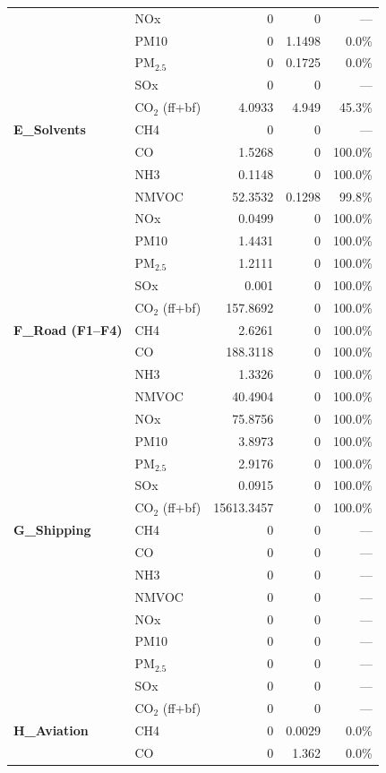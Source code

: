 \begin{longtable}{@{}llrrr@{}}
 & NOx & 0 & 0 & --- \\
 & PM10 & 0 & 1.1498 & 0.0\% \\
 & PM$_{2.5}$ & 0 & 0.1725 & 0.0\% \\
 & SOx & 0 & 0 & --- \\
 & CO$_2$ (ff+bf) & 4.0933 & 4.949 & 45.3\% \\
 \midrule
\addlinespace[2pt]
\textbf{E\_Solvents} & CH4 & 0 & 0 & --- \\
 & CO & 1.5268 & 0 & 100.0\% \\
 & NH3 & 0.1148 & 0 & 100.0\% \\
 & NMVOC & 52.3532 & 0.1298 & 99.8\% \\
 & NOx & 0.0499 & 0 & 100.0\% \\
 & PM10 & 1.4431 & 0 & 100.0\% \\
 & PM$_{2.5}$ & 1.2111 & 0 & 100.0\% \\
 & SOx & 0.001 & 0 & 100.0\% \\
 & CO$_2$ (ff+bf) & 157.8692 & 0 & 100.0\% \\
 \midrule
\addlinespace[2pt]
\textbf{F\_Road (F1--F4)} & CH4 & 2.6261 & 0 & 100.0\% \\
 & CO & 188.3118 & 0 & 100.0\% \\
 & NH3 & 1.3326 & 0 & 100.0\% \\
 & NMVOC & 40.4904 & 0 & 100.0\% \\
 & NOx & 75.8756 & 0 & 100.0\% \\
 & PM10 & 3.8973 & 0 & 100.0\% \\
 & PM$_{2.5}$ & 2.9176 & 0 & 100.0\% \\
 & SOx & 0.0915 & 0 & 100.0\% \\
 & CO$_2$ (ff+bf) & 15613.3457 & 0 & 100.0\% \\
 \midrule
\addlinespace[2pt]
\textbf{G\_Shipping} & CH4 & 0 & 0 & --- \\
 & CO & 0 & 0 & --- \\
 & NH3 & 0 & 0 & --- \\
 & NMVOC & 0 & 0 & --- \\
 & NOx & 0 & 0 & --- \\
 & PM10 & 0 & 0 & --- \\
 & PM$_{2.5}$ & 0 & 0 & --- \\
 & SOx & 0 & 0 & --- \\
 & CO$_2$ (ff+bf) & 0 & 0 & --- \\
 \midrule
\addlinespace[2pt]
\textbf{H\_Aviation} & CH4 & 0 & 0.0029 & 0.0\% \\
 & CO & 0 & 1.362 & 0.0\% \\

\end{longtable}
